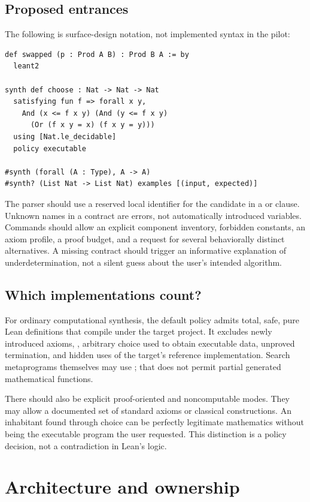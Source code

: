 \documentclass[11pt,a4paper]{article}
\newcommand{\code}[1]{\texttt{\detokenize{#1}}}
\theoremstyle{remark}
\begin{document}
\subsection{Proposed entrances}

The following is surface-design notation, not implemented syntax in the pilot:
\begin{lstlisting}
def swapped (p : Prod A B) : Prod B A := by
  leant2

synth def choose : Nat -> Nat -> Nat
  satisfying fun f => forall x y,
    And (x <= f x y) (And (y <= f x y)
      (Or (f x y = x) (f x y = y)))
  using [Nat.le_decidable]
  policy executable

#synth (forall (A : Type), A -> A)
#synth? (List Nat -> List Nat) examples [(input, expected)]
\end{lstlisting}

The parser should use a reserved local identifier for the candidate in a \code{where} or \code{satisfying} clause. Unknown names in a contract are errors, not automatically introduced variables. Commands should allow an explicit component inventory, forbidden constants, an axiom profile, a proof budget, and a request for several behaviorally distinct alternatives. A missing contract should trigger an informative explanation of underdetermination, not a silent guess about the user's intended algorithm.

\subsection{Which implementations count?}

For ordinary computational synthesis, the default policy admits total, safe, pure Lean definitions that compile under the target project. It excludes newly introduced axioms, \code{sorryAx}, arbitrary choice used to obtain executable data, unproved termination, and hidden uses of the target's reference implementation. Search metaprograms themselves may use \code{partial}; that does not permit partial generated mathematical functions.

There should also be explicit proof-oriented and noncomputable modes. They may allow a documented set of standard axioms or classical constructions. An inhabitant found through choice can be perfectly legitimate mathematics without being the executable program the user requested. This distinction is a policy decision, not a contradiction in Lean's logic.

\section{Architecture and ownership}\label{sec:architecture}
\end{document}
